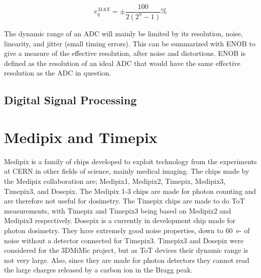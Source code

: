 \documentclass[../main/thesis.tex]{subfiles}
\begin{document}
\begin{equation}%
e_q^{MAX} = \pm \frac{100}{2(2^n - 1)}\%
\label{eq-eqmax}
\end{equation}

The dynamic range of an \gls{ADC} will mainly be limited by its resolution, noise, linearity, and jitter (small timing errors). This can be summarized with \gls{ENOB} to give a measure of the effective resolution, after noise and distortions. \gls{ENOB} is defined as the resolution of an ideal \gls{ADC} that would have the same effective resolution as the \gls{ADC} in question.

\subsection{Digital Signal Processing}
\label{t-dsp}


\section{Medipix and Timepix}
\label{e-medipix}
Medipix is a family of chips developed to exploit technology from the experiments at CERN in other fields of science, mainly medical imaging. The chips made by the Medipix collaboration are; Medipix1, Medipix2, Timepix, Medipix3, Timepix3, and Dosepix. The Medipix 1-3 chips are made for photon counting and are therefore not useful for dosimetry. The Timepix chips are made to do \gls{ToT} measurements, with Timepix and Timepix3 being based on Medipix2 and Medipix3 respectively. Dosepix is a currently in development chip made for photon dosimetry. They have extremely good noise properties, down to 60~e- of noise without a detector connected for Timepix3. Timepix3 and Dosepix were considered for the 3DMiMic project, but as \gls{ToT} devices their dynamic range is not very large. Also, since they are made for photon detectors they cannot read the large charges released by a carbon ion in the Bragg peak. 
\end{document}
